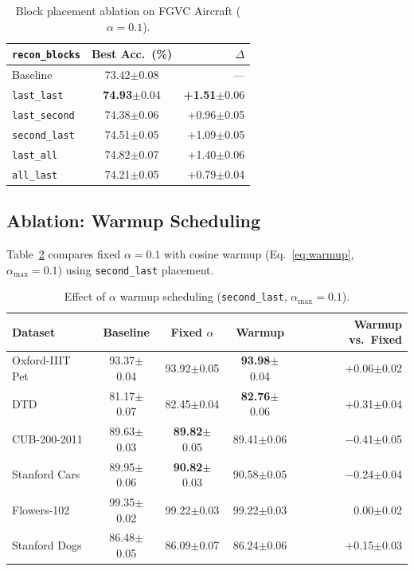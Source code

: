 \documentclass[review,12pt,authoryear]{elsarticle}
\newcommand{\std}[1]{{\scriptsize$\pm$#1}}
\begin{document}
\begin{table}[t]
\centering
\caption{Block placement ablation on FGVC Aircraft ($\alpha = 0.1$).}
\label{tab:aircraft}
\small
\begin{tabular}{lcr}
\toprule
\texttt{recon\_blocks} & Best Acc.\ (\%) & $\Delta$ \\
\midrule
Baseline               & 73.42\std{0.08} & --- \\
\texttt{last\_last}    & \textbf{74.93}\std{0.04} & \textbf{+1.51}\std{0.06} \\
\texttt{last\_second}  & 74.38\std{0.06} & +0.96\std{0.05} \\
\texttt{second\_last}  & 74.51\std{0.05} & +1.09\std{0.05} \\
\texttt{last\_all}     & 74.82\std{0.07} & +1.40\std{0.06} \\
\texttt{all\_last}     & 74.21\std{0.05} & +0.79\std{0.04} \\
\bottomrule
\end{tabular}
\end{table}

\subsection{Ablation: Warmup Scheduling}
\label{sec:exp:warmup}

Table~\ref{tab:warmup} compares fixed $\alpha = 0.1$ with cosine warmup (Eq.~\eqref{eq:warmup}, $\alpha_{\max} = 0.1$) using \texttt{second\_last} placement.

\begin{table}[t]
\centering
\caption{Effect of $\alpha$ warmup scheduling (\texttt{second\_last}, $\alpha_{\max} = 0.1$).}
\label{tab:warmup}
\small
\begin{tabular}{lcccr}
\toprule
Dataset & Baseline & Fixed $\alpha$ & Warmup & Warmup vs.\ Fixed \\
\midrule
Oxford-IIIT Pet  & 93.37\std{0.04} & 93.92\std{0.05} & \textbf{93.98}\std{0.04} & +0.06\std{0.02} \\
DTD              & 81.17\std{0.07} & 82.45\std{0.04} & \textbf{82.76}\std{0.06} & +0.31\std{0.04} \\
CUB-200-2011     & 89.63\std{0.03} & \textbf{89.82}\std{0.05} & 89.41\std{0.06} & $-$0.41\std{0.05} \\
Stanford Cars    & 89.95\std{0.06} & \textbf{90.82}\std{0.03} & 90.58\std{0.05} & $-$0.24\std{0.04} \\
Flowers-102      & 99.35\std{0.02} & 99.22\std{0.03} & 99.22\std{0.03}           & 0.00\std{0.02} \\
Stanford Dogs    & 86.48\std{0.05} & 86.09\std{0.07} & 86.24\std{0.06}           & +0.15\std{0.03} \\
\bottomrule
\end{tabular}
\end{table}
\end{document}
